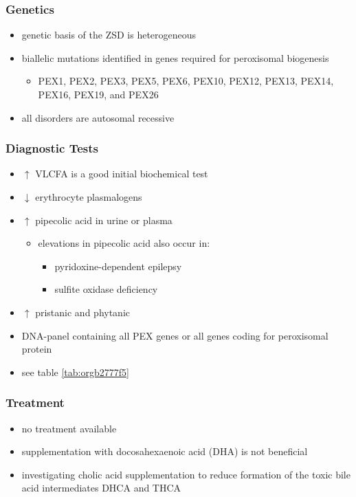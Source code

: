 \documentclass[12pt]{scrartcl}
\begin{document}
\subsubsection{Genetics}
\label{sec:orga9e783c}
\begin{itemize}
\item genetic basis of the ZSD is heterogeneous
\item biallelic mutations identified in genes required for peroxisomal biogenesis
\begin{itemize}
\item PEX1, PEX2, PEX3, PEX5, PEX6, PEX10, PEX12, PEX13, PEX14, PEX16, PEX19, and PEX26
\end{itemize}
\item all disorders are autosomal recessive
\end{itemize}

\subsubsection{Diagnostic Tests}
\label{sec:org57d0791}
\begin{itemize}
\item \(\uparrow\) VLCFA is a good initial biochemical test
\item \(\downarrow\) erythrocyte plasmalogens
\item \(\uparrow\) pipecolic acid in urine or plasma
\begin{itemize}
\item elevations in pipecolic acid also occur in:
\begin{itemize}
\item pyridoxine-dependent epilepsy
\item sulfite oxidase deficiency
\end{itemize}
\end{itemize}
\item \(\uparrow\) pristanic and phytanic
\item DNA-panel containing all PEX genes or all genes coding for
peroxisomal protein
\item see table \ref{tab:orgb2777f5}
\end{itemize}
\subsubsection{Treatment}
\label{sec:org6a0f3d7}
\begin{itemize}
\item no treatment available
\item supplementation with docosahexaenoic acid (DHA) is not beneficial
\item investigating cholic acid supplementation to reduce formation of the
toxic bile acid intermediates DHCA and THCA
\end{itemize}
\end{document}
